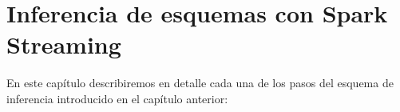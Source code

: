 \chapter{Inferencia de esquemas con Spark
  Streaming\label{06deployment}}

En este capítulo describiremos en detalle cada una de los pasos del
esquema de inferencia introducido en el capítulo anterior:



